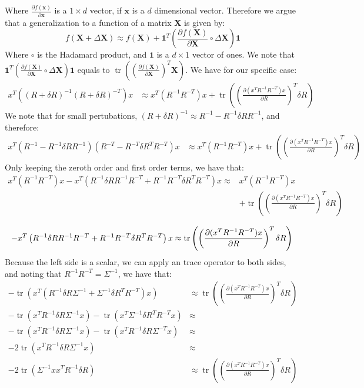 \documentclass[10pt]{article}
\DeclareMathOperator{\Tr}{tr}
\begin{document}
Where $\frac{\partial f(\mathbf{x})}{\partial \mathbf{x}}$ is a $1\times d$ vector, if $\mathbf{x}$ is a $d$ dimensional vector. Therefore 
we argue that a generalization to a function of a matrix $\mathbf{X}$ is given by:
\begin{equation}
    f(\mathbf{X}+\Delta \mathbf{X}) \approx f(\mathbf{X}) + \mathbf{1}^T\left(\frac{\partial f(\mathbf{X})}{\partial \mathbf{X}}\circ \Delta \mathbf{X}\right)\mathbf{1}
\end{equation}
Where $\circ$ is the Hadamard product, and $\mathbf{1}$ is a $d\times 1$ vector of ones. We note that $\mathbf{1}^T\left(\frac{\partial f(\mathbf{X})}{\partial \mathbf{X}}\circ \Delta \mathbf{X}\right)\mathbf{1}$
equals to $\Tr\left(\left(\frac{\partial f(\mathbf{X})}{\partial \mathbf{X}}\right)^T\mathbf{X}\right)$. We have for our specific case:
\begin{align*}
    x^T((R+\delta R)^{-1}(R+\delta R)^{-T})x &\approx x^T(R^{-1}R^{-T})x + \Tr\left(\left(\frac{\partial(x^TR^{-1}R^{-T})x}{\partial R}\right)^T  \delta R\right)
\end{align*}
We note that for small pertubations, $(R+\delta R)^{-1} \approx R^{-1} - R^{-1}\delta R R^{-1}$, and therefore:
\begin{align*}
    x^T (R^{-1} - R^{-1}\delta R R^{-1})(R^{-T} - R^{-T}\delta R^T R^{-T})x &\approx x^T(R^{-1}R^{-T})x + \Tr\left(\left(\frac{\partial(x^TR^{-1}R^{-T})x}{\partial R}\right)^T  \delta R\right)
\end{align*}
Only keeping the zeroth order and first order terms, we have that:
\begin{align*}
    x^T(R^{-1}R^{-T})x - x^T \left(R^{-1}\delta R R^{-1}R^{-T} + R^{-1}R^{-T}\delta R^T R^{-T}\right)x \approx& x^T(R^{-1}R^{-T})x \\&+ \Tr\left(\left(\frac{\partial(x^TR^{-1}R^{-T})x}{\partial R}\right)^T  \delta R\right)\\
\end{align*}
\begin{equation}
    - x^T \left(R^{-1}\delta R R^{-1}R^{-T} + R^{-1}R^{-T}\delta R^T R^{-T}\right)x \approx \Tr\left(\left(\frac{\partial(x^TR^{-1}R^{-T})x}{\partial R}\right)^T  \delta R\right)\\
\end{equation}
Because the left side is a scalar, we can apply an trace operator to both sides, and noting that $R^{-1}R^{-T}=\Sigma^{-1}$, we have that:
\begin{align*}
    -\Tr\left(x^T \left(R^{-1}\delta R \Sigma^{-1} + \Sigma^{-1}\delta R^T R^{-T}\right)x\right) &\approx \Tr\left(\left(\frac{\partial(x^TR^{-1}R^{-T})x}{\partial R}\right)^T  \delta R\right)\\
    -\Tr\left(x^T R^{-1}\delta R \Sigma^{-1}x\right) -\Tr\left( x^T\Sigma^{-1}\delta R^T R^{-T}x\right)&\approx\\
    -\Tr\left(x^T R^{-1}\delta R \Sigma^{-1}x\right)-\Tr\left( x^TR^{-1}\delta R \Sigma^{-T} x\right)&\approx\\
    -2\Tr\left(x^T R^{-1}\delta R \Sigma^{-1}x\right) &\approx\\
    -2\Tr\left( \Sigma^{-1}xx^T R^{-1}\delta R\right) &\approx \Tr\left(\left(\frac{\partial(x^TR^{-1}R^{-T})x}{\partial R}\right)^T  \delta R\right)
\end{align*}
\end{document}

